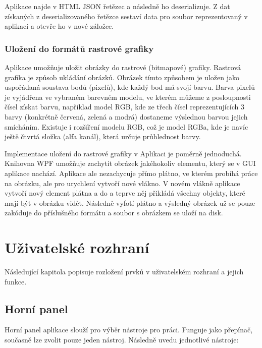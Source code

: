 \documentclass[
  field=inf,
  biblatex=false,
  glossaries,
  index
]{kidiplom}
\begin{document}
Aplikace najde v HTML JSON řetězec a následně ho deserializuje. Z dat získaných z deserializovaného řetězce sestaví data pro soubor reprezentovaný v aplikaci a otevře ho v nové záložce.

\subsubsection{Uložení do formátů rastrové grafiky}
Aplikace umožňuje uložit obrázky do rastrové (bitmapové) grafiky. Rastrová grafika je způsob ukládání obrázků. Obrázek tímto způsobem je uložen jako uspořádaná soustava bodů (pixelů), kde každý bod má svojí barvu. Barva pixelů je vyjádřena ve vybraném barevném modelu, ve kterém můžeme z posloupnosti čísel získat barvu, například model RGB, kde ze třech čísel reprezentujících 3 barvy (konkrétně červená, zelená a modrá) dostaneme výslednou barvou jejich smícháním. Existuje i rozšíření modelu RGB, což je model RGBa, kde je navíc ještě čtvrtá složka (alfa kanál), která určuje průhlednost barvy.

Implementace uložení do rastrové grafiky v Aplikaci je poměrně jednoduchá. Knihovna WPF umožňuje zachytit obrázek jakéhokoliv elementu, který se v GUI aplikace nachází. Aplikace ale nezachycuje přímo plátno, ve kterém probíhá práce na obrázku, ale pro urychlení vytvoří nové vlákno. V novém vlákně aplikace vytvoří nový element plátna a do a teprve něj přikládá všechny objekty, které mají být v obrázku vidět. Následně vyfotí plátno a výsledný obrázek už se pouze zakóduje do příslušného formátu a soubor s obrázkem se uloží na disk.


\section{Uživatelské rozhraní}

Následující kapitola popisuje rozložení prvků v uživatelském rozhraní a jejich funkce.

\subsection{Horní panel}
Horní panel aplikace slouží pro výběr nástroje pro práci. Funguje jako přepínač, současně lze zvolit pouze jeden nástroj. Následně uvedu jednotlivé nástroje:
\end{document}
